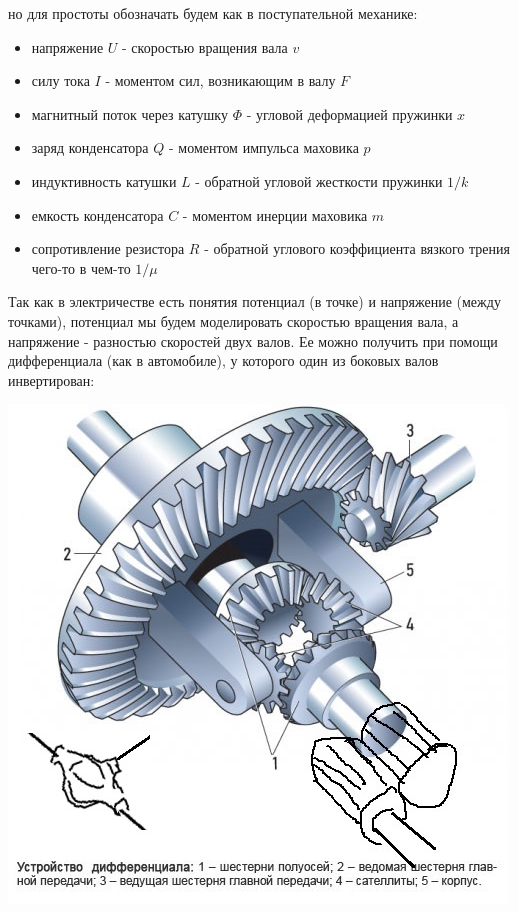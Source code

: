 \documentclass[11pt]{article} %
\begin{document}
но для простоты обозначать будем как в поступательной механике:
\begin{itemize}
\item напряжение $U$ - скоростью вращения вала $v$
\item силу тока $I$ - моментом сил, возникающим в валу $F$
\item магнитный поток через катушку $\Phi$ - угловой деформацией пружинки $x$
\item заряд конденсатора $Q$ - моментом импульса маховика $p$
\item индуктивность катушки $L$ - обратной угловой жесткости пружинки $1/k$
\item емкость конденсатора $C$ - моментом инерции маховика $m$
\item сопротивление резистора $R$ - обратной углового коэффициента вязкого трения чего-то в чем-то $1/\mu$
\end{itemize}

Так как в электричестве есть понятия потенциал (в точке) и напряжение (между точками),
потенциал мы будем моделировать скоростью вращения вала, а напряжение - разностью скоростей двух валов.
Ее можно получить при помощи дифференциала (как в автомобиле), у которого один из боковых валов инвертирован:

\includegraphics{../ustroistvo-differenciala.jpg}
\end{document}
